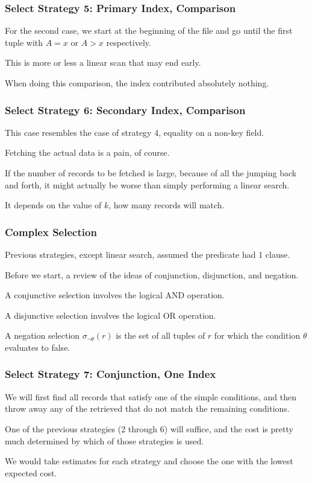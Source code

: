 \begin{frame}
\frametitle{Select Strategy 5: Primary Index, Comparison}

For the second case, we start at the beginning of the file and go until the first tuple with $A = x$ or $A > x$ respectively. 

This is more or less a linear scan that may end early.

When doing this comparison, the index contributed absolutely nothing.


\end{frame}


\begin{frame}
\frametitle{Select Strategy 6: Secondary Index, Comparison}

This case resembles the case of strategy 4, equality on a non-key field. 

Fetching the actual data is a pain, of course. 

If the number of records to be fetched is large, because of all the jumping back and forth, it might actually be worse than simply performing a linear search.  

It depends on the value of $k$, how many records will match. 

\end{frame}


\begin{frame}
\frametitle{Complex Selection}

Previous strategies, except linear search, assumed the predicate had 1 clause. 

Before we start, a review of the ideas of conjunction, disjunction, and negation.

A conjunctive selection involves the logical AND operation.

A disjunctive selection involves the logical OR operation. 

A negation selection $\sigma_{\neg \theta}(r)$ is the set of all tuples of $r$ for which the condition $\theta$ evaluates to false. 

\end{frame}

\begin{frame}
\frametitle{Select Strategy 7: Conjunction, One Index}
We will first find all records that satisfy one of the simple conditions, and then throw away any of the retrieved that do not match the remaining conditions. 

One of the previous strategies (2 through 6) will suffice, and the cost is pretty much determined by which of those strategies is used. 

We would take estimates for each strategy and choose the one with the lowest expected cost.

\end{frame}



